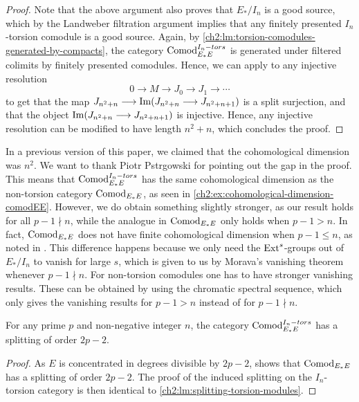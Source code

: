 \begin{proof}
    Note that the above argument also proves that $E_*/I_n$ is a good source, which by the Landweber filtration argument implies that any finitely presented $I_n$-torsion comodule is a good source. Again, by \cref{ch2:lm:torsion-comodules-generated-by-compacts}, the category $\mathrm{Comod}_{E_*E}^{I_n-tors}$ is generated under filtered colimits by finitely presented comodules. Hence, we can apply \cite[2.4]{pstragowski_2021} to any injective resolution 
    $$0\longrightarrow M \longrightarrow J_0 \longrightarrow J_1\longrightarrow \cdots$$
    to get that the map $J_{n^2+n}\longrightarrow \operatorname{Im}(J_{n^2+n}\longrightarrow J_{n^2+n+1})$ is a split surjection, and that the object $\operatorname{Im}(J_{n^2+n}\longrightarrow J_{n^2+n+1})$ is injective. Hence, any injective resolution can be modified to have length $n^2+n$, which concludes the proof. 
\end{proof}

\begin{remark}
    In a previous version of this paper, we claimed that the cohomological dimension was $n^2$. We want to thank Piotr Pstr\a{}gowski for pointing out the gap in the proof. This means that $\mathrm{Comod}_{E_*E}^{I_n-tors}$ has the same cohomological dimension as the non-torsion category $\mathrm{Comod}_{E_*E}$, as seen in \cref{ch2:ex:cohomological-dimension-comodEE}. However, we do obtain something slightly stronger, as our result holds for all $p-1\nmid n$, while the analogue in $\mathrm{Comod}_{E_*E}$ only holds when $p-1>n$. In fact, $\mathrm{Comod}_{E_*E}$ does not have finite cohomological dimension when $p-1\leq n$, as noted in \cite[2.6]{pstragowski_2021}. This difference happens because we only need the $\operatorname{Ext}^s$-groups out of $E_*/I_n$ to vanish for large $s$, which is given to us by Morava's vanishing theorem whenever $p-1\nmid n$. For non-torsion comodules one has to have stronger vanishing results. These can be obtained by using the chromatic spectral sequence, which only gives the vanishing results for $p-1>n$ instead of for $p-1\nmid n$. 
\end{remark}

\begin{lemma}
    \label{ch2:lm:splitting-torsion-comodules}
    For any prime $p$ and non-negative integer $n$, the category $\mathrm{Comod}_{E_*E}^{I_n-tors}$ has a splitting of order $2p-2$. 
\end{lemma}
\begin{proof}
    As $E$ is concentrated in degrees divisible by $2p-2$, \cite[8.13]{patchkoria-pstragowski_2021} shows that $\mathrm{Comod}_{E_*E}$ has a splitting of order $2p-2$. The proof of the induced splitting on the $I_n$-torsion category is then identical to \cref{ch2:lm:splitting-torsion-modules}. 
\end{proof}

